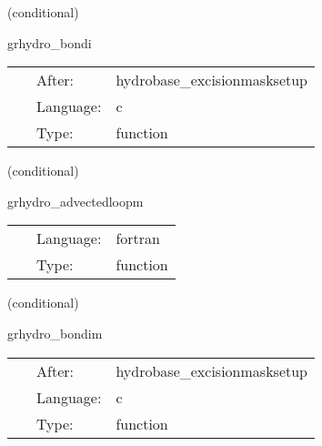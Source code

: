 \vspace{5mm}

   (conditional) 

\hspace{5mm} grhydro\_bondi 

\hspace{5mm}{\it setup grhydro vars for the hydrodynamic bondi solution } 


\hspace{5mm}

 \begin{tabular*}{160mm}{cll} 
~ & After:  & hydrobase\_excisionmasksetup \\ 
~ & Language:  & c \\ 
~ & Type:  & function \\ 
\end{tabular*} 


\vspace{5mm}

   (conditional) 

\hspace{5mm} grhydro\_advectedloopm 

\hspace{5mm}{\it mhd advected loop initial data } 


\hspace{5mm}

 \begin{tabular*}{160mm}{cll} 
~ & Language:  & fortran \\ 
~ & Type:  & function \\ 
\end{tabular*} 


\vspace{5mm}

   (conditional) 

\hspace{5mm} grhydro\_bondim 

\hspace{5mm}{\it setup grhydro vars for the magnetized bondi solution } 


\hspace{5mm}

 \begin{tabular*}{160mm}{cll} 
~ & After:  & hydrobase\_excisionmasksetup \\ 
~ & Language:  & c \\ 
~ & Type:  & function \\ 
\end{tabular*} 


